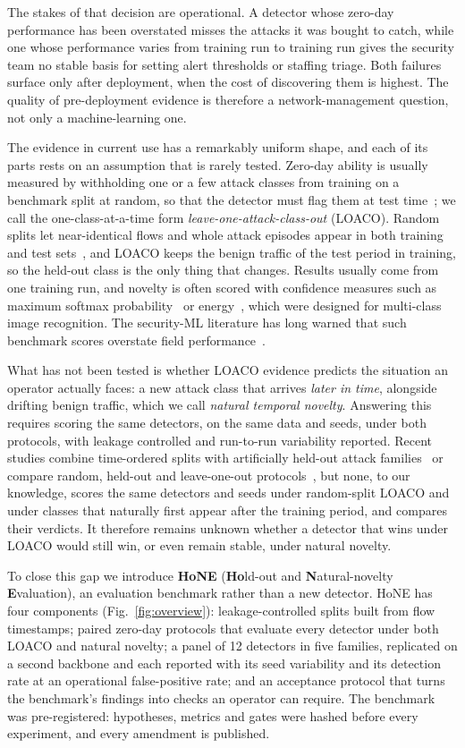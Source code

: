 \documentclass[conference]{IEEEtran}
\begin{document}
The stakes of that decision are operational. A detector whose zero-day performance has been overstated misses the attacks it was bought to catch, while one whose performance varies from training run to training run gives the security team no stable basis for setting alert thresholds or staffing triage. Both failures surface only after deployment, when the cost of discovering them is highest. The quality of pre-deployment evidence is therefore a network-management question, not only a machine-learning one.

The evidence in current use has a remarkably uniform shape, and each of its parts rests on an assumption that is rarely tested. Zero-day ability is usually measured by withholding one or a few attack classes from training on a benchmark split at random, so that the detector must flag them at test time~\cite{wilkie2026}; we call the one-class-at-a-time form \emph{leave-one-attack-class-out} (LOACO). Random splits let near-identical flows and whole attack episodes appear in both training and test sets~\cite{arp2022}, and LOACO keeps the benign traffic of the test period in training, so the held-out class is the only thing that changes. Results usually come from one training run, and novelty is often scored with confidence measures such as maximum softmax probability~\cite{hendrycks2017} or energy~\cite{liu2020energy}, which were designed for multi-class image recognition. The security-ML literature has long warned that such benchmark scores overstate field performance~\cite{sommer2010,apruzzese2023sok}.

What has not been tested is whether LOACO evidence predicts the situation an operator actually faces: a new attack class that arrives \emph{later in time}, alongside drifting benign traffic, which we call \emph{natural temporal novelty}. Answering this requires scoring the same detectors, on the same data and seeds, under both protocols, with leakage controlled and run-to-run variability reported. Recent studies combine time-ordered splits with artificially held-out attack families~\cite{nayak2026,alhalangy2026} or compare random, held-out and leave-one-out protocols~\cite{mesca2026,raj2026}, but none, to our knowledge, scores the same detectors and seeds under random-split LOACO and under classes that naturally first appear after the training period, and compares their verdicts. It therefore remains unknown whether a detector that wins under LOACO would still win, or even remain stable, under natural novelty.

To close this gap we introduce \textbf{HoNE} (\textbf{Ho}ld-out and \textbf{N}atural-novelty \textbf{E}valuation), an evaluation benchmark rather than a new detector. HoNE has four components (Fig.~\ref{fig:overview}): leakage-controlled splits built from flow timestamps; paired zero-day protocols that evaluate every detector under both LOACO and natural novelty; a panel of 12 detectors in five families, replicated on a second backbone and each reported with its seed variability and its detection rate at an operational false-positive rate; and an acceptance protocol that turns the benchmark's findings into checks an operator can require. The benchmark was pre-registered: hypotheses, metrics and gates were hashed before every experiment, and every amendment is published.
\end{document}
